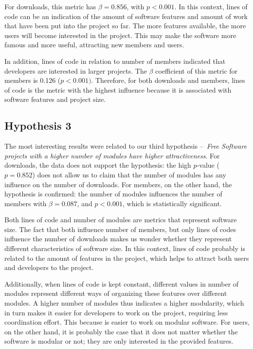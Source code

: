 \documentclass[conference]{IEEEtran}
\begin{document}
For downloads, this metric has $\beta = 0.856$, with $p<0.001$.
%
In this context, lines of code can be an indication of the amount of
software features and amount of work that have been put into the project so far.
%
The more features available, the more users will become interested in the project.
%
This may make the software more famous and more useful, attracting new members and users.


In addition, lines of code in relation to number of members indicated that
developers are interested in larger projects. The $\beta$ coefficient of
this metric for members is 0.126 ($p<0.001)$.
%
Therefore, for both downloads and members, lines of code is the metric with
the highest influence because it is associated with software features and project size.

\subsection{Hypothesis 3}

The most interesting results were related to our third hypothesis
--~\emph{Free Software projects with a higher number of modules have
higher attractiveness}.
%
For downloads, the data does not support the hypothesis: the high
$p$-value ( $p= 0.852$) does not allow us to claim that the number of
modules has any influence on the number of downloads.
%
For members, on the other hand, the hypothesis is confirmed: the number of modules
influences the number of members with $\beta = 0.087$, and $p<0.001$, which is
statistically significant.

Both lines of code and number of modules are metrics that represent software
size. The fact that both influence number of members, but only lines of codes
influence the number of downloads makes us wonder whether they represent
different characteristics of software size.
%
In this context, lines of code probably is related to the amount of features in the project, 
which helps to attract both users and developers to the project.


Additionally, when lines of code is kept constant, different values in
number of modules represent different ways of organizing these features over
different modules.
%
A higher number of modules thus indicates a higher modularity, which in turn makes
it easier for developers to work on the project, requiring less
coordination effort. This because is easier to work on modular software.
%
For users, on the other hand, it is probably the case that it does not matter
whether the software is modular or not; they are only interested in the provided features.
\end{document}
